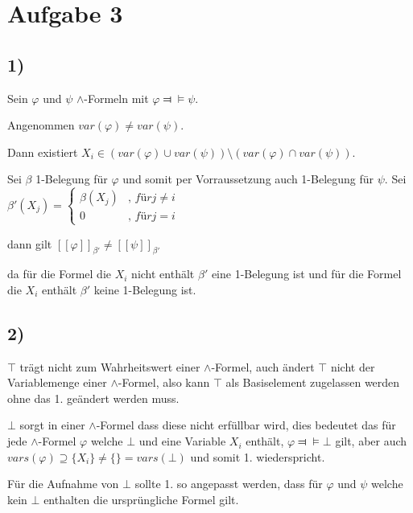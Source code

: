 \section*{Aufgabe 3}

\subsection*{1)}

Sein $\varphi$ und $\psi$ $\wedge$-Formeln mit $\varphi \Dashv \vDash \psi$.

Angenommen $var(\varphi) \neq var(\psi).$

Dann existiert $X_i \in (var(\varphi) \cup var(\psi)) \setminus (var(\varphi) \cap var(\psi))$.

Sei $\beta$ 1-Belegung für $\varphi$ und somit per Vorraussetzung auch 1-Belegung für $\psi$.
Sei $\beta'(X_j) = \begin{cases}
	\beta(X_j) &\textit{, für} j \neq i \\
	0		  &\textit{, für} j = i
	\end{cases}
$ 

dann gilt $[\![\varphi]\!]_{\beta'} \neq [\![\psi]\!]_{\beta'}$

da für die Formel die $X_i$ nicht enthält $\beta'$ eine 1-Belegung ist und für die Formel die $X_i$ enthält $\beta'$ keine 1-Belegung ist. 




\subsection*{2)}

$\top$ trägt nicht zum Wahrheitswert einer $\wedge$-Formel,
 auch ändert $\top$ nicht der Variablemenge einer $\wedge$-Formel,
 also kann $\top$ als Basiselement zugelassen werden ohne das 1. geändert werden muss.

$\bot$ sorgt in einer $\wedge$-Formel dass diese nicht erfüllbar wird,
dies bedeutet das für jede $\wedge$-Formel $\varphi$ welche $\bot$ und eine Variable $X_i$ enthält,
 $\varphi \Dashv \vDash \bot$  gilt, aber auch $vars(\varphi) \supseteq \{X_i\} \neq \{\} = vars(\bot)$ und somit 1. wiederspricht.
 
Für die Aufnahme von $\bot$ sollte 1. so angepasst werden, 
	dass für $\varphi$ und $\psi$ welche kein $\bot$ enthalten die ursprüngliche Formel gilt.
	